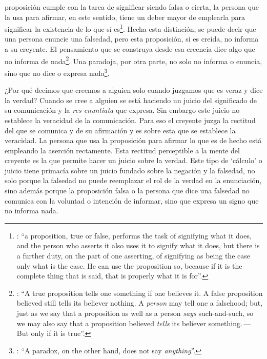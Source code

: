 proposición cumple con la tarea de significar siendo falsa o cierta, la persona que la usa para afirmar, en este sentido, tiene un deber mayor de emplearla para significar la existencia de lo que sí es\footnote{\cite[Cf.][267]{anscombe2015logic:tsa}: \enquote{a proposition, true or false, performs the task of signifying what it does, and the person who asserts it also uses it to signify what it does, but there is a further duty, on the part of one asserting, of signifying as being the case only what is the case. He can use the proposition so, because if it is the complete thing that is said, that is properly what it is for}.}. Hecha esta distinción, se puede decir que una persona enuncie una falsedad, pero esta proposición, si es creída, no informa a su creyente. El pensamiento que se construya desde esa creencia dice algo que no informa de nada\footnote{\cite[Cf.][271]{anscombe2015logic:tsa}: \enquote{A true proposition tells one something if one believes it. A false proposition believed still tells its believer nothing. A \emph{person} may tell one a falsehood; but, just as we say that a proposition as well as a person \emph{says} such-and-such, so we may also say that a proposition believed \emph{tells} its believer something.\,---\,But only if it is true}.}. Una paradoja, por otra parte, no solo no informa o enuncia, sino que no dice o expresa nada\footnote{\cite[Cf.][271]{anscombe2015logic:tsa}: \enquote{A paradox, on the other hand, does not say \emph{anything}}.}.

¿Por qué decimos que creemos a alguien solo cuando juzgamos que es veraz y dice la verdad? Cuando se cree a alguien se está haciendo un juicio del significado de su comunicación y la \emph{res enuntiata} que expresa. Sin embargo este juicio no establece la veracidad de la comunicación. Para eso el creyente juzga la rectitud del que se comunica y de su afirmación y es sobre esta que se establece la veracidad. La persona que usa la proposición para afirmar lo que es de hecho está empleando la aserción rectamente. Esta rectitud perceptible a la mente del creyente es la que permite hacer un juicio sobre la verdad. Este tipo de `cálculo' o juicio tiene primacía sobre un juicio fundado sobre la negación y la falsedad, no solo porque la falsedad no puede reemplazar el rol de la verdad en la enunciación, sino además porque la proposición falsa o la persona que dice una falsedad no comunica con la voluntad o intención de informar, sino que expresa un signo que no informa nada.

